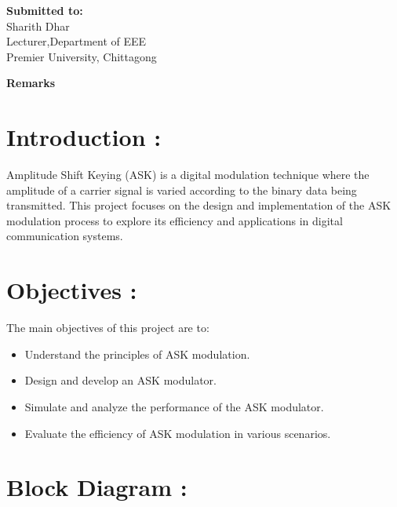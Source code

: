 \documentclass[12pt,a4paper]{article}
\begin{document}
\begin{titlepage}
    \begin{minipage}[t]{0.5\textwidth}
        \textbf{Submitted to:}
        \\ Sharith Dhar
        \\Lecturer,Department of EEE\\ Premier University, Chittagong
    \end{minipage}%
    \begin{minipage}[t]{0.6\textwidth}
        \raggedleft
        \textbf{Remarks}\\
        \vspace{0.5cm} %
    \end{minipage}

    \date{\today}
    \vfill
\end{titlepage}

\newpage

\section*{Introduction :}
Amplitude Shift Keying (ASK) is a digital modulation technique where the amplitude of a carrier signal is varied according to the binary data being transmitted. This project focuses on the design and implementation of the ASK modulation process to explore its efficiency and applications in digital communication systems.

\section*{Objectives :}
The main objectives of this project are to:
\begin{itemize}
    \item Understand the principles of ASK modulation.
    \item Design and develop an ASK modulator.
    \item Simulate and analyze the performance of the ASK modulator.
    \item Evaluate the efficiency of ASK modulation in various scenarios.
\end{itemize}


\section*{Block Diagram :}
\end{document}

